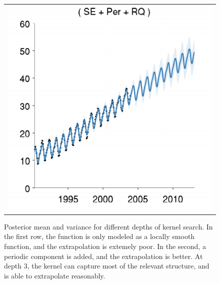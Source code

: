 \documentclass[twoside]{article}
\begin{document}
\begin{figure}[h!]
\begin{tabular}{c}
 \includegraphics[width=\wmg,height=\hmg]{../figures/decomposition/03-mauna2003-s_max_level_2/03-mauna2003-s_all_small}
\end{tabular}
\caption{Posterior mean and variance for different depths of kernel search.  In the first row, the function is only modeled as a locally smooth function, and the extrapolation is extemely poor.  In the second, a periodic component is added, and the extrapolation is better.  At depth 3, the kernel can capture most of the relevant structure, and is able to extrapolate reasonably. }
\label{fig:mauna_grow}
\end{figure}
\end{document}
